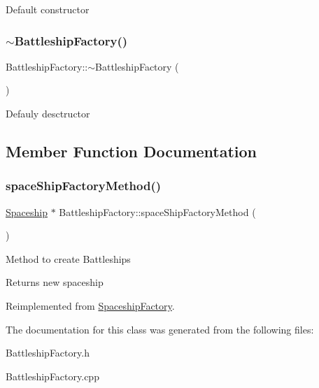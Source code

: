 Default constructor \mbox{\label{classBattleshipFactory_a18d29d1462e12301c49c2632144ff5e4}} 
\subsubsection{\texorpdfstring{$\sim$\+Battleship\+Factory()}{~BattleshipFactory()}}
{\footnotesize\ttfamily Battleship\+Factory\+::$\sim$\+Battleship\+Factory (\begin{DoxyParamCaption}{ }\end{DoxyParamCaption})}

Defauly desctructor 

\subsection{Member Function Documentation}
\mbox{\label{classBattleshipFactory_a247e5af33c513bc110dbc73e84aa2bb1}} 
\subsubsection{\texorpdfstring{space\+Ship\+Factory\+Method()}{spaceShipFactoryMethod()}}
{\footnotesize\ttfamily \hyperlink{classSpaceship}{Spaceship} $\ast$ Battleship\+Factory\+::space\+Ship\+Factory\+Method (\begin{DoxyParamCaption}{ }\end{DoxyParamCaption})\hspace{0.3cm}{\ttfamily [virtual]}}

Method to create Battleships \begin{DoxyReturn}{Returns}
new spaceship 
\end{DoxyReturn}


Reimplemented from \hyperlink{classSpaceshipFactory_a146f5e82385a55e9bf4ce63e28f99a9d}{Spaceship\+Factory}.



The documentation for this class was generated from the following files\+:\begin{DoxyCompactItemize}
\item 
Battleship\+Factory.\+h\item 
Battleship\+Factory.\+cpp\end{DoxyCompactItemize}
